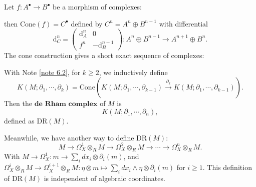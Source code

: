 \quad

\begin{note}\label{note 6.2}
    Let $f: A^\bullet \longrightarrow B^\bullet$ be a morphism of complexes:

    \begin{center}
    \end{center}

    then $\mathrm{\mathrm{Cone}}(f)=C^{\bullet}$ defined by $C^n = A^n \oplus B^{n-1}$ with differential $$\mathrm{d}_C^n = \begin{pmatrix}
            \mathrm{d}_A^n & 0                   \\
            f^n            & -\mathrm{d}_B^{n-1}
        \end{pmatrix}: A^n \oplus B^{n-1} \longrightarrow A^{n+1} \oplus B^n.$$The cone construction gives a short exact sequence of complexes:
    \begin{center}
    \end{center}
\end{note}


With Note \ref{note 6.2}, for $k \geq 2$, we inductively define
$$
    K(M; \partial_1, \cdots, \partial_k) = \mathrm{Cone}\left(K(M; \partial_1, \cdots, \partial_{k-1}) \xrightarrow{\partial_k} K(M; \partial_1, \cdots, \partial_{k-1})\right).
$$
Then the $\textbf{de Rham complex}$ of $M$ is
$$
    K(M; \partial_1, \cdots, \partial_n),
$$
defined as $\mathrm{DR}(M).$

Meanwhile, we have another way to define $\mathrm{DR}(M)$:
$$M \to \Omega^{1}_{X} \otimes_{R} M \to \Omega^{2}_{X} \otimes_{R} M \to \cdots \to \Omega^{n}_{X} \otimes_{R} M.$$
With $M \to \Omega^{1}_{X}: m\rightarrow \sum\limits_{i}dx_{i}\otimes \partial_{i}(m)$, and $\Omega^{i}_{X} \otimes_{R} M \to \Omega^{i+1}_{X} \otimes_{R} M:\eta \otimes m \mapsto \sum\limits_{i} dx_i \wedge \eta \otimes \partial_i(m)$ for $i\ge 1$.
This definition of $\mathrm{DR}(M)$ is independent of algebraic coordinates.

